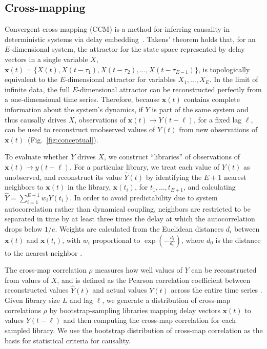 \documentclass[10pt,letterpaper]{article}
\newcommand{\bx}{\mathbf{x}}
\newcommand{\hY}{\hat{Y}}
\begin{document}
\subsection*{Cross-mapping}

Convergent cross-mapping (CCM) is a method for inferring causality in deterministic systems via delay embedding~\cite{Sugihara2012}.
Takens' theorem holds that, for an $E$-dimensional system, the attractor for the state space represented by delay vectors in a single variable $X$, $\mathbf{x}(t) = \{X(t), X(t - \tau_1), X(t - \tau_2), \ldots , X(t - \tau_{E-1}) \}$, is topologically equivalent to the $E$-dimensional attractor for variables $X_1, ..., X_E$.
In the limit of infinite data, the full $E$-dimensional attractor can be reconstructed perfectly from a one-dimensional time series.
Therefore, because $\bx(t)$ contains complete information about the system's dynamics, if $Y$ is part of the same system and thus causally drives $X$, observations of $\bx(t) \rightarrow Y(t - \ell)$, for a fixed lag $\ell$, can be used to reconstruct unobserved values of $Y(t)$ from new observations of $\bx(t)$~(Fig.~\ref{fig:conceptual}).

To evaluate whether $Y$ drives $X$, we construct ``libraries'' of observations of $\bx(t) \rightarrow y(t - \ell)$.
For a particular library, we treat each value of $Y(t)$ as unobserved, and reconstruct its value $\hY(t)$ by identifying the $E + 1$ nearest neighbors to $\bx(t)$ in the library, $\bx(t_i)$, for $t_1, \ldots, t_{E+1}$, and calculating $\hY = \sum_{i = 1}^{E + 1} w_i Y(t_i)$.
In order to avoid predictability due to system autocorrelation rather than dynamical coupling, neighbors are restricted to be separated in time by at least three times the delay at which the autocorrelation drops below $1/e$.
Weights are calculated from the Euclidean distances $d_i$ between $\bx(t)$ and $\bx(t_i)$, with $w_i$ proportional to $\exp \left( -\frac{d_i}{d_0} \right)$, where $d_0$ is the distance to the nearest neighbor \cite{Sugihara2012}.

The cross-map correlation $\rho$ measures how well values of $Y$ can be reconstructed from values of $X$, and is defined as the Pearson correlation coefficient between reconstructed values $\hY(t)$ and actual values $Y(t)$ across the entire time series \cite{Ye2015}.
Given library size $L$ and lag $\ell$, we generate a distribution of cross-map correlations $\rho$ by bootstrap-sampling libraries mapping delay vectors $\bx(t)$ to values $Y(t - \ell)$ and then computing the cross-map correlation for each sampled library.
We use the bootstrap distribution of cross-map correlation as the basis for statistical criteria for causality.
\end{document}
